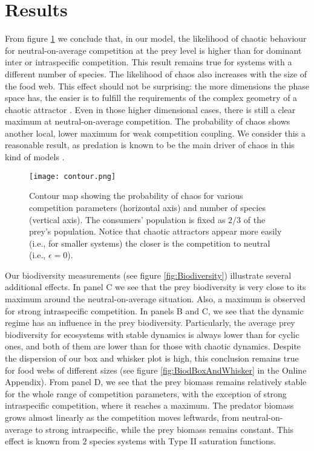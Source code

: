 \section{Results}
\label{sec:Results}
From figure \ref{fig:Contour} we conclude that, in our model, the likelihood of chaotic behaviour for neutral-on-average competition at the prey level is higher than for dominant inter or intraspecific competition. This result remains true for systems with a different number of species. The likelihood of chaos also increases with the size of the food web. This effect should not be surprising: the more dimensions the phase space has, the easier is to fulfill the requirements of the complex geometry of a chaotic attractor \citep{Strogatz1994}. Even in those higher dimensional cases, there is still a clear maximum at neutral-on-average competition. The probability of chaos shows another local, lower maximum for weak competition coupling. We consider this a reasonable result, as predation is known to be the main driver of chaos in this kind of models \citep{Scheffer2004}.

\begin{figure}
	\begin{center}
		\texttt{[image: contour.png]}
	\end{center}
	\caption{Contour map showing the probability of chaos for various competition parameters (horizontal axis) and number of species (vertical axis). The consumers' population is fixed as $ 2/3 $ of the prey's population. Notice that chaotic attractors appear more easily (i.e., for smaller systems) the closer is the competition to neutral (i.e., $ \epsilon = 0 $).}
	\label{fig:Contour}
\end{figure}

Our biodiversity measurements (see figure \ref{fig:Biodiversity}) illustrate several additional effects. In panel C we see that the prey biodiversity is very close to its maximum around the neutral-on-average situation. Also, a maximum is observed for strong intraspecific competition. In panels B and C, we see that the dynamic regime has an influence in the prey biodiversity. Particularly, the average prey biodiversity for ecosystems with stable dynamics is always lower than for cyclic ones, and both of them are lower than for those with chaotic dynamics. Despite the dispersion of our box and whisker plot is high, this conclusion remains true for food webs of different sizes (see figure \ref{fig:BiodBoxAndWhisker} in the Online Appendix). From panel D, we see that the prey biomass remains relatively stable for the whole range of competition parameters, with the exception of strong intraspecific competition, where it reaches a maximum. The predator biomass grows almost linearly as the competition moves leftwards, from neutral-on-average to strong intraspecific, while the prey biomass remains constant. This effect is known from $ 2 $ species systems with Type II saturation functions. 

